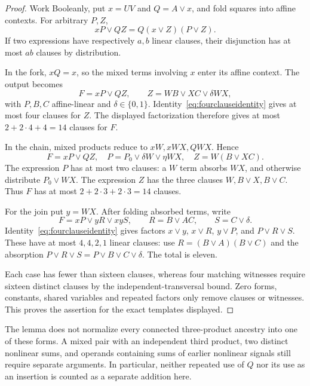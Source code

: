 \documentclass[11pt]{article}
\theoremstyle{definition}
\theoremstyle{remark}
\begin{document}
\begin{proof}
Work Booleanly, put $x=UV$ and $Q=A\vee x$, and fold squares into affine contexts. For arbitrary $P,Z$,
\[
 xP\vee QZ=Q(x\vee Z)(P\vee Z).
\]
If two expressions have respectively $a,b$ linear clauses, their disjunction has at most $ab$ clauses by distribution.

In the fork, $xQ=x$, so the mixed terms involving $x$ enter its affine context. The output becomes
\[
 F=xP\vee QZ,\qquad Z=WB\vee XC\vee\delta WX,
\]
with $P,B,C$ affine-linear and $\delta\in\{0,1\}$. Identity~\eqref{eq:fourclauseidentity} gives at most four clauses for $Z$. The displayed factorization therefore gives at most $2+2\cdot4+4=14$ clauses for $F$.

In the chain, mixed products reduce to $xW,xWX,QWX$. Hence
\[
 F=xP\vee QZ,\quad P=P_0\vee\delta W\vee\eta WX,
 \quad Z=W(B\vee XC).
\]
The expression $P$ has at most two clauses: a $W$ term absorbs $WX$, and otherwise distribute $P_0\vee WX$. The expression $Z$ has the three clauses $W,B\vee X,B\vee C$. Thus $F$ has at most $2+2\cdot3+2\cdot3=14$ clauses.

For the join put $y=WX$. After folding absorbed terms, write
\[
 F=xP\vee yR\vee xyS,\qquad R=B\vee AC,\qquad S=C\vee\delta.
\]
Identity~\eqref{eq:fourclauseidentity} gives factors $x\vee y$, $x\vee R$, $y\vee P$, and $P\vee R\vee S$. These have at most $4,4,2,1$ linear clauses: use $R=(B\vee A)(B\vee C)$ and the absorption $P\vee R\vee S=P\vee B\vee C\vee\delta$. The total is eleven.

Each case has fewer than sixteen clauses, whereas four matching witnesses require sixteen distinct clauses by the independent-transversal bound. Zero forms, constants, shared variables and repeated factors only remove clauses or witnesses. This proves the assertion for the exact templates displayed.
\end{proof}

The lemma does not normalize every connected three-product ancestry into one of these forms. A mixed pair with an independent third product, two distinct nonlinear sums, and operands containing sums of earlier nonlinear signals still require separate arguments. In particular, neither repeated use of $Q$ nor its use as an insertion is counted as a separate addition here.
\end{document}
